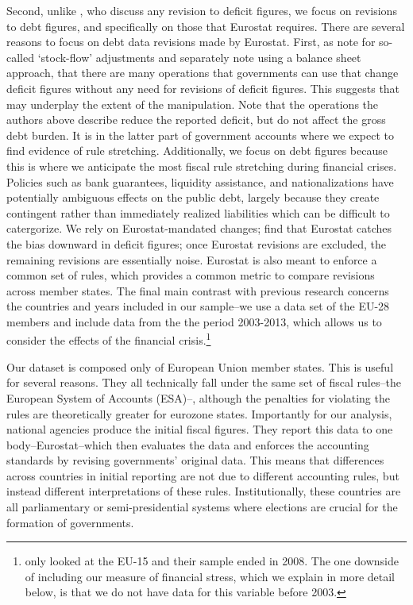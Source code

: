 \documentclass[]{article}
\begin{document}
Second, unlike \cite{DeCastro2013}, who discuss any revision to deficit figures, we focus on  revisions to debt figures, and specifically on those that Eurostat requires. There are several reasons to focus on debt data revisions made by Eurostat. First, as \cite{vonHagenWolff2006} note for so-called `stock-flow' adjustments and \cite{MilesiMoriyama2006}  separately note using a balance sheet approach, that there are many operations that governments can use that change deficit figures without any need for revisions of deficit figures. This suggests that \cite{DeCastro2013} may underplay the extent of the manipulation. Note that the operations the authors above describe reduce the reported deficit, but do not affect the gross debt burden. It is in the latter part of government accounts where we expect to find evidence of rule stretching. Additionally, we focus on debt figures because this is where we anticipate the most fiscal rule stretching during financial crises. Policies such as bank guarantees, liquidity assistance, and nationalizations have potentially ambiguous effects on the public debt, largely because they create contingent rather than immediately realized liabilities which can be difficult to catergorize. We rely on Eurostat-mandated changes; \cite{DeCastro2013} find that Eurostat catches the bias downward in deficit figures; once Eurostat revisions are excluded, the remaining revisions are essentially noise. Eurostat is also meant to enforce a common set of rules, which provides a common metric to compare revisions across member states. The final main contrast with previous research concerns the countries and years included in our sample--we use a data set of the EU-28 members and include data from the the period 2003-2013, which allows us to consider the effects of the financial crisis.\footnote{\cite{DeCastro2013} only looked at the EU-15 and their sample ended in 2008. The one downside of including our measure of financial stress, which we explain in more detail below, is that we do not have data for this variable before 2003.}

Our dataset is composed only of European Union member states. This is useful for several reasons. They all technically fall under the same set of fiscal rules--the European System of Accounts (ESA)--, although the penalties for violating the rules are theoretically greater for eurozone states.  Importantly for our analysis, national agencies produce the initial fiscal figures. They report this data to one body--Eurostat--which then evaluates the data and enforces the accounting standards by revising governments' original data. This means that differences across countries in initial reporting are not due to different accounting rules, but instead  different interpretations of these rules. Institutionally, these countries are all parliamentary or semi-presidential systems where elections are crucial for the formation of governments.
\end{document}
